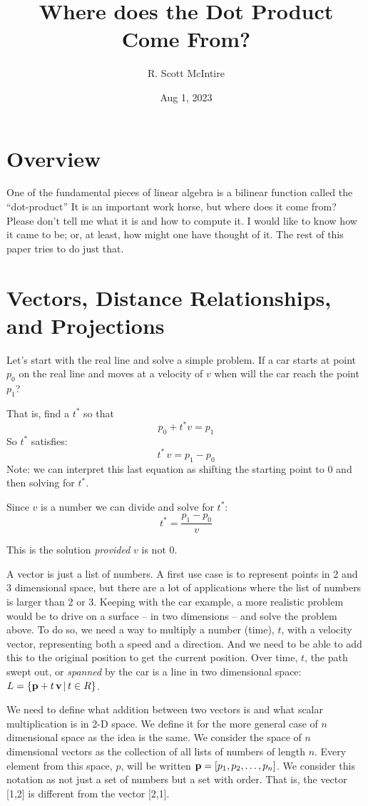 \documentclass[12pt]{article}
\title{Where does the Dot Product Come From?}
\author{R. Scott McIntire}
\date{Aug 1, 2023}
\begin{document}
\maketitle

\section{Overview}
One of the fundamental pieces of linear algebra is a bilinear function
called the ``dot-product'' It is an important work horse, but where does
it come from? Please don't tell me what it is and how to compute it.
I would like to know how it came to be; or, at least, how might one
have thought of it. The rest of this paper tries to do just that.

\section{ Vectors, Distance Relationships, and Projections}
Let's start with the real line and solve a simple problem. If a car starts at 
point $p_0$ on the real line and moves at a velocity of $v$ when will the car 
reach the point $p_1$?


That is, find a $t^*$ so that
$$ p_0 + t^* v = p_1$$
So $t^*$ satisfies:
$$ t^* \, v = p_1 - p_0$$
Note: we can interpret this last equation as shifting the starting point 
to $0$ and then solving for $t^*$.

Since $v$ is a number we can divide and solve for 
$t^*$:%
$$ t^* = \frac{p_1 - p_0}{v} $$

This is the solution {\em provided\/} $v$ is not $0$.

A vector is just a list of numbers. A first use case is to represent points 
in 2 and 3 dimensional space, but there are a lot of applications where the 
list of numbers is larger than 2 or 3. Keeping with the car example, a more 
realistic problem would be to drive on a surface -- in two dimensions -- and 
solve the problem above. To do so, we need a way to multiply a 
number (time), $t$, with a velocity vector, representing both a speed and 
a direction. And we need to be able to add this to the original position to 
get the current position.
Over time, $t$, the path swept out, or {\em spanned\/} by the car is a 
line in two dimensional space: 
$L = \{{\bf p} + t \, {\bf v} \, | \, t \in R\}$.

We need to define what addition between two vectors is and what scalar 
multiplication is in 2-D space. We define it for the more general case 
of $n$ dimensional space as the idea is the same. We consider the space of 
$n$ dimensional vectors as the collection of all lists of numbers of 
length $n$. Every element from this space, $p$,
will be written ${\bf p} = [p_1, p_2, \ldots, p_n]$.
We consider this notation as not just a set of numbers but a set with order. 
That is, the vector [1,2] is different from the vector [2,1].
\end{document}
